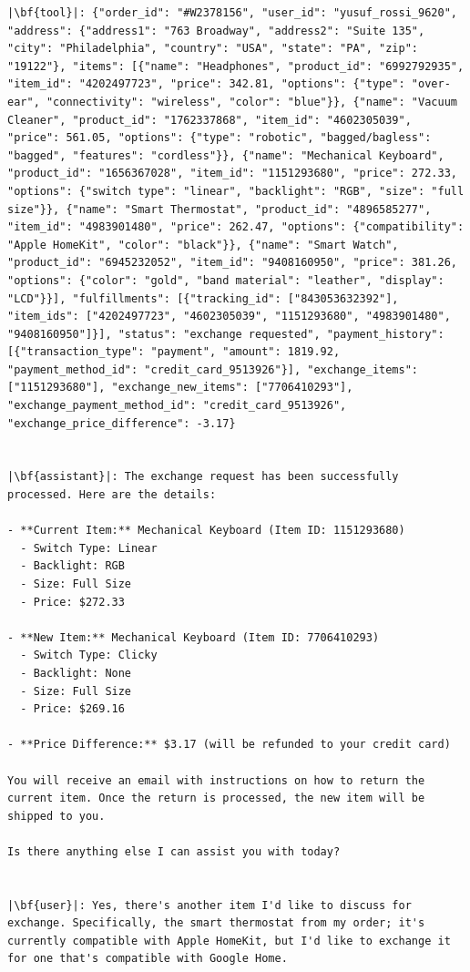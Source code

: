 \begin{longlisting}
\begin{verbatim}
|\bf{tool}|: {"order_id": "#W2378156", "user_id": "yusuf_rossi_9620", "address": {"address1": "763 Broadway", "address2": "Suite 135", "city": "Philadelphia", "country": "USA", "state": "PA", "zip": "19122"}, "items": [{"name": "Headphones", "product_id": "6992792935", "item_id": "4202497723", "price": 342.81, "options": {"type": "over-ear", "connectivity": "wireless", "color": "blue"}}, {"name": "Vacuum Cleaner", "product_id": "1762337868", "item_id": "4602305039", "price": 561.05, "options": {"type": "robotic", "bagged/bagless": "bagged", "features": "cordless"}}, {"name": "Mechanical Keyboard", "product_id": "1656367028", "item_id": "1151293680", "price": 272.33, "options": {"switch type": "linear", "backlight": "RGB", "size": "full size"}}, {"name": "Smart Thermostat", "product_id": "4896585277", "item_id": "4983901480", "price": 262.47, "options": {"compatibility": "Apple HomeKit", "color": "black"}}, {"name": "Smart Watch", "product_id": "6945232052", "item_id": "9408160950", "price": 381.26, "options": {"color": "gold", "band material": "leather", "display": "LCD"}}], "fulfillments": [{"tracking_id": ["843053632392"], "item_ids": ["4202497723", "4602305039", "1151293680", "4983901480", "9408160950"]}], "status": "exchange requested", "payment_history": [{"transaction_type": "payment", "amount": 1819.92, "payment_method_id": "credit_card_9513926"}], "exchange_items": ["1151293680"], "exchange_new_items": ["7706410293"], "exchange_payment_method_id": "credit_card_9513926", "exchange_price_difference": -3.17}


|\bf{assistant}|: The exchange request has been successfully processed. Here are the details:

- **Current Item:** Mechanical Keyboard (Item ID: 1151293680)
  - Switch Type: Linear
  - Backlight: RGB
  - Size: Full Size
  - Price: $272.33

- **New Item:** Mechanical Keyboard (Item ID: 7706410293)
  - Switch Type: Clicky
  - Backlight: None
  - Size: Full Size
  - Price: $269.16

- **Price Difference:** $3.17 (will be refunded to your credit card)

You will receive an email with instructions on how to return the current item. Once the return is processed, the new item will be shipped to you.

Is there anything else I can assist you with today?


|\bf{user}|: Yes, there's another item I'd like to discuss for exchange. Specifically, the smart thermostat from my order; it's currently compatible with Apple HomeKit, but I'd like to exchange it for one that's compatible with Google Home.



\end{verbatim}
\end{longlisting}
